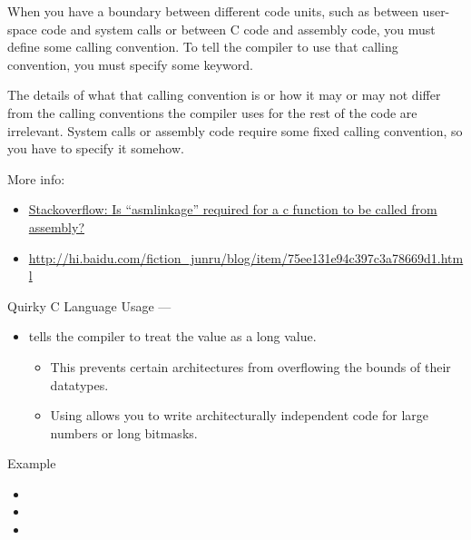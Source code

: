\begin{description}
When you have a boundary between different code units, such as between 
user-space code and system calls or between C code and assembly code, 
you must define some calling convention. To tell the compiler to use 
that calling convention, you must specify some keyword. 

The details of what that calling convention is or how it may or may 
not differ from the calling conventions the compiler uses for the rest 
of the code are irrelevant. System calls or assembly code require some 
fixed calling convention, so you have to specify it somehow. 
\end{description}
More info:
\begin{itemize}
\item
  \href{http://stackoverflow.com/questions/10060168/is-asmlinkage-required-for-a-c-function-to-be-called-from-assembly}{Stackoverflow:
    Is “asmlinkage” required for a c function to be called from assembly?}
\item \url{http://hi.baidu.com/fiction_junru/blog/item/75ee131e94c397c3a78669d1.html}
\end{itemize}

\begin{frame}{Quirky C Language Usage}{ --- }
  \begin{itemize}
  \item[\code{UL}] tells the compiler to treat the value as a long value.
    \begin{itemize}
    \item This prevents certain architectures from overflowing the bounds of their datatypes.
    \item Using  allows you to write architecturally independent code for large
      numbers or long bitmasks.
    \end{itemize}
  \end{itemize}
  \begin{block}{Example}
    \begin{itemize}
    \item[] 
    \item[] 
    \item[] 
    \end{itemize}
  \end{block}
\end{frame}

